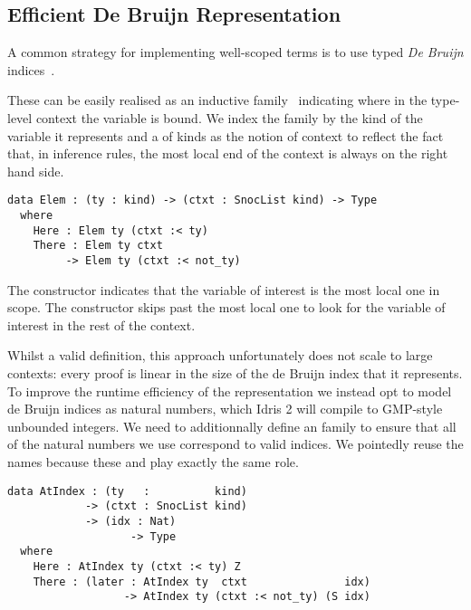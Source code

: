 \subsection{Efficient De Bruijn Representation}
\label{sec:design:deBruijn}


A common strategy for implementing well-scoped terms is to use typed
\emph{De Bruijn} indices~\cite{MANUAL:journals/math/debruijn72}.

These can be easily realised as an inductive family~\cite{DBLP:journals/fac/Dybjer94}
indicating where in the type-level context the variable is bound.
%
We index the  family by the kind of the variable it represents and
a  of kinds as the notion of context to reflect the fact that,
in inference rules, the most local end of the context is always on the right hand side.

\begin{verbatim}
data Elem : (ty : kind) -> (ctxt : SnocList kind) -> Type
  where
    Here : Elem ty (ctxt :< ty)
    There : Elem ty ctxt
         -> Elem ty (ctxt :< not_ty)
\end{verbatim}

The  constructor indicates that the variable of interest is
the most local one in scope.
%
The  constructor skips past the most local one to look for
the variable of interest in the rest of the context.

Whilst a valid definition, this approach unfortunately does not scale to
large contexts: every  proof is linear in the size of the de Bruijn
index that it represents.
%
To improve the runtime efficiency of the representation we instead opt to
model de Bruijn indices as natural numbers, which Idris 2 will compile to
GMP-style unbounded integers.
%
We need to additionnally define an  family to ensure that
all of the natural numbers we use correspond to valid indices.%
%
We pointedly reuse the  names because these 
and  play exactly the same role.

\begin{verbatim}
data AtIndex : (ty   :          kind)
            -> (ctxt : SnocList kind)
            -> (idx : Nat)
                   -> Type
  where
    Here : AtIndex ty (ctxt :< ty) Z
    There : (later : AtIndex ty  ctxt               idx)
                  -> AtIndex ty (ctxt :< not_ty) (S idx)
\end{verbatim}

